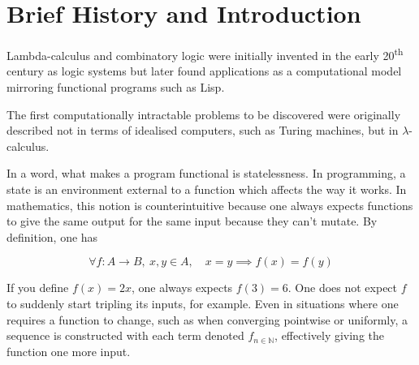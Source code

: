 \section{Brief History and Introduction}
Lambda-calculus and combinatory logic were initially invented in the early 20\textsuperscript{th} century as logic systems but later found applications as a computational model mirroring functional programs such as Lisp.

The first computationally intractable problems to be discovered were originally described not in terms of idealised computers, such as Turing machines, but in $\lambda$-calculus\cite{LambdaAndCombinatorsIntro}.

\begin{itemize}
\end{itemize}
In a word, what makes a program functional is statelessness. In programming, a state is an environment external to a function which affects the way it works. In mathematics, this notion is counterintuitive because one always expects functions to give the same output for the same input because they can't mutate. By definition, one has

\begin{equation*}
    \forall f:A\rightarrow B,\ x,y\in A,\quad x=y \implies f(x)=f(y)
\end{equation*}

If you define $f(x) = 2x$, one always expects $f(3) = 6$. One does not expect $f$ to suddenly start tripling its inputs, for example. Even in situations where one requires a function to change, such as when converging pointwise or uniformly, a sequence is constructed with each term denoted $f_{n \in\mathbb{N}}$, effectively giving the function one more input. 

